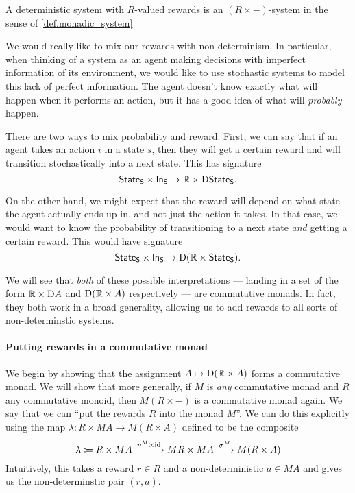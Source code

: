 \documentclass[DynamicalBook]{subfiles}
\begin{document}
\begin{definition}
A deterministic system with $R$-valued rewards is an $(R \times -)$-system in
the sense of \cref{def.monadic_system}
\end{definition}

We would really like to mix our rewards with non-determinism. In particular,
when thinking of a system as an agent making decisions with imperfect
information of its environment, we would like to use stochastic systems to model
this lack of perfect information. The agent doesn't know exactly what will
happen when it performs an action, but it has a good idea of what will
\emph{probably} happen.

There are two ways to mix probability and reward. First, we can say that if an
agent takes an action $i$ in a state $s$, then they will get a certain reward
and will transition stochastically into a next state. This has signature
\[
  \mathsf{State}_{\mathsf{S}} \times \mathsf{In}_{\mathsf{S}} \to \mathbb{R} \times \mathrm{D} \mathsf{State}_{\mathsf{S}}.
\]

On the other hand, we might expect that the reward will depend on what state the
agent actually ends up in, and not just the action it takes. In that case, we
would want to know the probability of transitioning to a next state \emph{and}
getting a certain reward. This would have signature
\[
  \mathsf{State}_{\mathsf{S}} \times \mathsf{In}_{\mathsf{S}} \to \mathrm{D}(\mathbb{R} \times \mathsf{State}_{\mathsf{S}}).
\]

We will see that \emph{both} of these possible interpretations --- landing in a
set of the form $\mathbb{R} \times
\mathrm{D} A$ and $\mathrm{D} (\mathbb{R} \times A)$ respectively --- are commutative
monads. In fact, they both work in a broad generality, allowing us to add
rewards to all sorts of non-determinstic systems.

\paragraph{Putting rewards in a commutative monad}

 We begin by showing that the assignment $A \mapsto \mathrm{D}(\mathbb{R} \times A)$
 forms a commutative monad. We will show that more generally, if $M$ is
 \emph{any} commutative monad and $R$ any commutative monoid, then $M(R \times
 -)$ is a commutative monad again. We say that we can ``put the rewards $R$ into
 the monad $M$''. We can do this explicitly using the map $\lambda : R \times MA
 \to M(R \times A)$ defined to be the composite
 \[
\lambda \coloneqq R \times MA \xrightarrow{\eta^M \times \mathrm{id}} MR \times MA \xrightarrow{\sigma^M} M(R \times A)
 \]
Intuitively, this takes a reward $r \in R$ and a non-deterministic $a \in MA$
and gives us the non-determinstic pair $(r, a)$.
 
\end{document}
